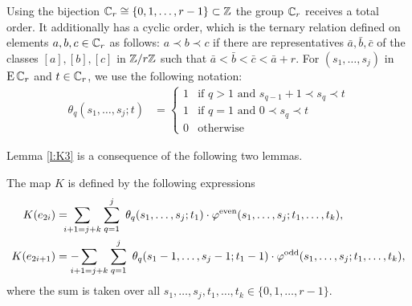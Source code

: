 Using the bijection $\mathbb{C}_r \cong \{0,1,\dots,r-1\} \subset \mathbb{Z}$ the group $\mathbb{C}_r$ receives a total order.
It additionally has a cyclic order, which is the ternary relation defined on elements $a,b,c \in \mathbb{C}_r$ as follows:
$a \prec b \prec c$ if there are representatives $\bar{a},\bar{b},\bar{c}$ of the classes $[a],[b],[c]$ in $\mathbb{Z}/r\mathbb{Z}$ such that $\bar{a} < \bar{b} < \bar{c} < \bar{a}+r$.
For $(s_1,\dots,s_j)$ in $\operatorname{E}\mathbb{C}_r$ and $t\in \mathbb{C}_r$, we use the following notation:
\begin{align*}
	\theta_q(s_1,\ldots,s_j;t) &=
	\begin{cases}
		1 & \text{if $q>1$ and $s_{q-1}+1\prec s_q\prec t$}\\
		1 & \text{if $q=1$ and $0\prec s_q\prec t$} \\
		0 & \text{otherwise}
	\end{cases}
\end{align*}

Lemma \ref{l:K3} is a consequence of the following two lemmas.

\begin{lemma}
	The map $K$ is defined by the following expressions
	\begin{align} \label{eq:homotopyK'1}
		K(e_{2i}) &= \ \sum_{\mathclap{i+1 = j+k}} \quad \sum_{q=1}^j \
		\theta_q(s_1,\dots,s_j;t_1)\cdot \varphi^{\mathrm{even}}(s_1,\dots,s_j;t_1,\dots,t_k), \\ \label{eq:homotopyK'2}
		K(e_{2i+1}) &= -\sum_{\mathclap{i+1 = j+k}} \quad \sum_{\mathclap{q=1}}^j \
		\theta_q(s_1-1,\dots,s_j-1;t_1-1)\cdot \varphi^{\mathrm{odd}}(s_1,\dots,s_j;t_1,\dots,t_k),
	\end{align}
	where the sum is taken over all $s_1,\dots,s_j,t_1,\dots,t_k\in \{0,1,\dots,r-1\}$.
\end{lemma}

